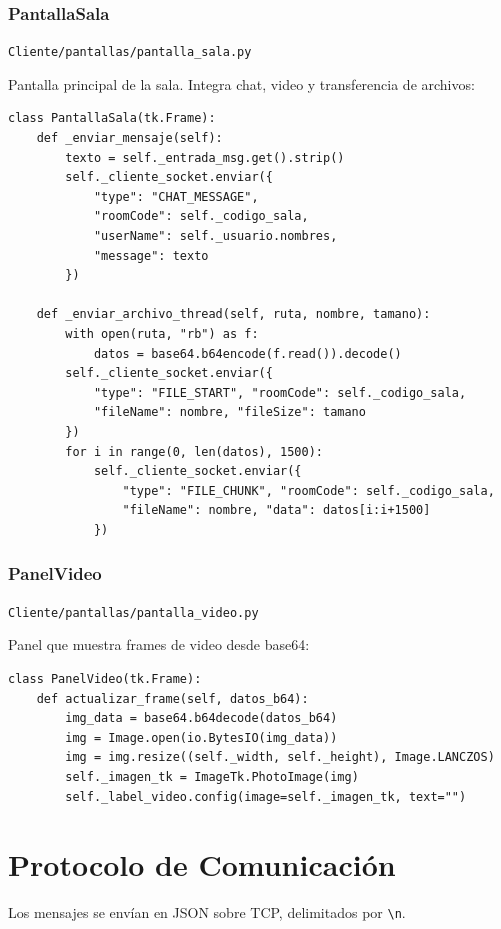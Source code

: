 \documentclass[12pt,a4paper]{article}
\begin{document}
\subsubsection{PantallaSala}
\texttt{Cliente/pantallas/pantalla\_sala.py}

Pantalla principal de la sala. Integra chat, video y transferencia de archivos:

\begin{lstlisting}
class PantallaSala(tk.Frame):
    def _enviar_mensaje(self):
        texto = self._entrada_msg.get().strip()
        self._cliente_socket.enviar({
            "type": "CHAT_MESSAGE",
            "roomCode": self._codigo_sala,
            "userName": self._usuario.nombres,
            "message": texto
        })

    def _enviar_archivo_thread(self, ruta, nombre, tamano):
        with open(ruta, "rb") as f:
            datos = base64.b64encode(f.read()).decode()
        self._cliente_socket.enviar({
            "type": "FILE_START", "roomCode": self._codigo_sala,
            "fileName": nombre, "fileSize": tamano
        })
        for i in range(0, len(datos), 1500):
            self._cliente_socket.enviar({
                "type": "FILE_CHUNK", "roomCode": self._codigo_sala,
                "fileName": nombre, "data": datos[i:i+1500]
            })
\end{lstlisting}

\subsubsection{PanelVideo}
\texttt{Cliente/pantallas/pantalla\_video.py}

Panel que muestra frames de video desde base64:

\begin{lstlisting}
class PanelVideo(tk.Frame):
    def actualizar_frame(self, datos_b64):
        img_data = base64.b64decode(datos_b64)
        img = Image.open(io.BytesIO(img_data))
        img = img.resize((self._width, self._height), Image.LANCZOS)
        self._imagen_tk = ImageTk.PhotoImage(img)
        self._label_video.config(image=self._imagen_tk, text="")
\end{lstlisting}

\section{Protocolo de Comunicaci\'on}

Los mensajes se env\'ian en JSON sobre TCP, delimitados por \verb|\n|.
\end{document}
